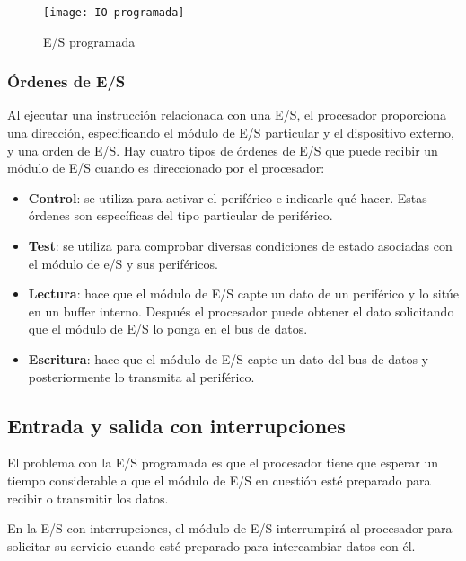\begin{figure}[h]
  \centering
  \texttt{[image: IO-programada]}
  \caption{E/S programada}\label{fig:E/S-programada}
\end{figure}

\begin{subs}

  \subsubsection{Órdenes de E/S}
  Al ejecutar una instrucción relacionada con una E/S, el procesador proporciona una dirección, especificando el módulo de E/S particular y el dispositivo externo, y una orden de E/S. Hay cuatro tipos de órdenes de E/S que puede recibir un módulo de E/S cuando es direccionado por el procesador:

  \begin{itemize}
    \item \textbf{Control}: se utiliza para activar el periférico e indicarle qué hacer. Estas órdenes son específicas del tipo particular de periférico.
    \item \textbf{Test}: se utiliza para comprobar diversas condiciones de estado asociadas con el módulo de e/S y sus periféricos.
    \item \textbf{Lectura}: hace que el módulo de E/S capte un dato de un periférico y lo sitúe en un buffer interno. Después el procesador puede obtener el dato solicitando que el módulo de E/S lo ponga en el bus de datos.
    \item \textbf{Escritura}: hace que el módulo de E/S capte un dato del bus de datos y posteriormente lo transmita al periférico.
  \end{itemize}

\end{subs}

\subsection{Entrada y salida con interrupciones}

El problema con la E/S programada es que el procesador tiene que esperar un tiempo considerable a que el módulo de E/S en cuestión esté preparado para recibir o transmitir los datos.

En la E/S con interrupciones, el módulo de E/S interrumpirá al procesador para solicitar su servicio cuando esté preparado para intercambiar datos con él.


